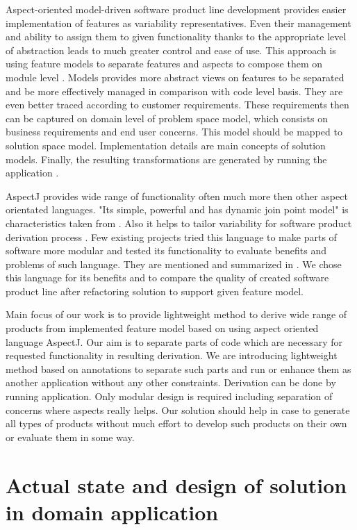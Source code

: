 \documentclass[11pt,english,a4paper,twoside]{article}
\begin{document}
Aspect-oriented model-driven software product line development provides easier implementation of features as variability representatives. Even their management and ability to assign them to given functionality thanks to the appropriate level of abstraction leads to much greater control and ease of use. This approach is using feature models to separate features and aspects to compose them on module level \cite{voelter_product_2007}. Models provides more abstract views on features to be separated and be more effectively managed in comparison with code level basis. They are even better traced according to customer requirements. These requirements then can be captured on domain level of problem space model, which consists on business requirements and end user concerns. This model should be mapped to solution space model. Implementation details are main concepts of solution models. Finally, the resulting transformations are generated by running the application \cite{voelter_product_2007}. 

AspectJ provides wide range of functionality often much more then other aspect orientated languages. "Its simple, powerful and has dynamic join point model" is characteristics taken from \cite{goos_overview_2001}. Also it helps to tailor variability for software product derivation process \cite{young_using_1999}. Few existing projects tried this language to make parts of software more modular and tested its functionality to evaluate benefits and problems of such language. They are mentioned and summarized in \cite{figueiredo_evolving_2008}. We chose this language for its benefits and to compare the quality of created software product line after refactoring solution to support given feature model.


Main focus of our work is to provide lightweight method to derive wide range of products from implemented feature model based on using aspect oriented language AspectJ. Our aim is to separate parts of code which are necessary for requested functionality in resulting derivation. We are introducing lightweight method based on annotations to separate such parts and run or enhance them as another application without any other constraints. Derivation can be done by running application. Only modular design is required including separation of concerns where aspects really helps. Our solution should help in case to generate all types of products without much effort to develop such products on their own or evaluate them in some way. 
      
			
\section{Actual state and design of solution in domain application} \label{actualGameState}
\end{document}
